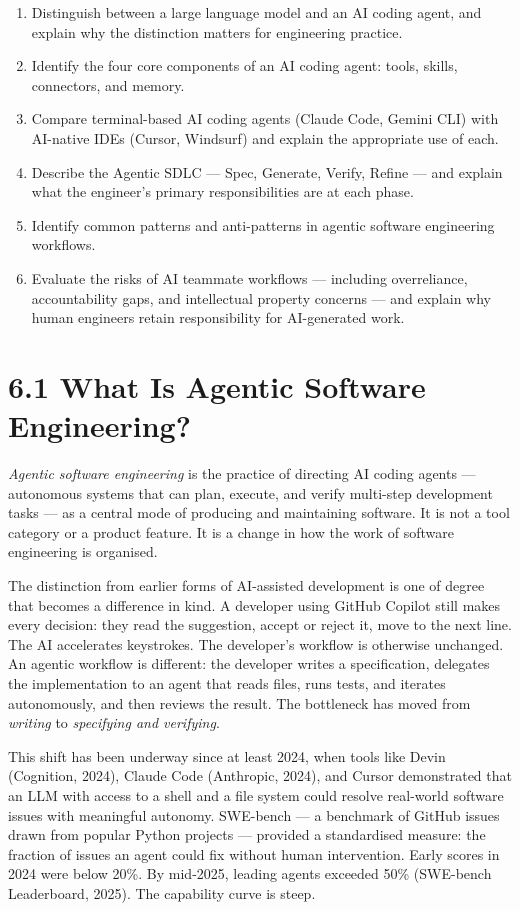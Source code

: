 \documentclass[11pt,a4paper]{book}
\begin{document}
\begin{enumerate}
  \item Distinguish between a large language model and an AI coding agent, and explain why the distinction matters for engineering practice.
  \item Identify the four core components of an AI coding agent: tools, skills, connectors, and memory.
  \item Compare terminal-based AI coding agents (Claude Code, Gemini CLI) with AI-native IDEs (Cursor, Windsurf) and explain the appropriate use of each.
  \item Describe the Agentic SDLC --- Spec, Generate, Verify, Refine --- and explain what the engineer's primary responsibilities are at each phase.
  \item Identify common patterns and anti-patterns in agentic software engineering workflows.
  \item Evaluate the risks of AI teammate workflows --- including overreliance, accountability gaps, and intellectual property concerns --- and explain why human engineers retain responsibility for AI-generated work.
\end{enumerate}

\medskip

\section{6.1 What Is Agentic Software Engineering?}

\textit{Agentic software engineering} is the practice of directing AI coding agents --- autonomous systems that can plan, execute, and verify multi-step development tasks --- as a central mode of producing and maintaining software. It is not a tool category or a product feature. It is a change in how the work of software engineering is organised.

The distinction from earlier forms of AI-assisted development is one of degree that becomes a difference in kind. A developer using GitHub Copilot still makes every decision: they read the suggestion, accept or reject it, move to the next line. The AI accelerates keystrokes. The developer's workflow is otherwise unchanged. An agentic workflow is different: the developer writes a specification, delegates the implementation to an agent that reads files, runs tests, and iterates autonomously, and then reviews the result. The bottleneck has moved from \textit{writing} to \textit{specifying and verifying}.

This shift has been underway since at least 2024, when tools like Devin (Cognition, 2024), Claude Code (Anthropic, 2024), and Cursor demonstrated that an LLM with access to a shell and a file system could resolve real-world software issues with meaningful autonomy. SWE-bench --- a benchmark of GitHub issues drawn from popular Python projects --- provided a standardised measure: the fraction of issues an agent could fix without human intervention. Early scores in 2024 were below 20\%. By mid-2025, leading agents exceeded 50\% (SWE-bench Leaderboard, 2025). The capability curve is steep.
\end{document}
